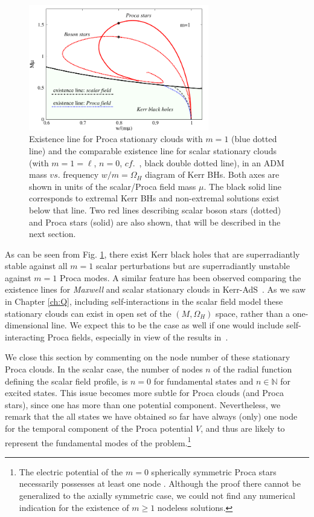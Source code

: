 \begin{figure}[h!]
  \begin{center}
    \includegraphics[width=0.7\textwidth]{papers/Proca/wM-m1-comparison.pdf}
  \end{center}
 \caption{Existence line for Proca stationary clouds with $m=1$ (blue dotted line) and the comparable existence line for scalar stationary clouds (with $m=1=\ell$, $n=0$, $cf.$~\cite{Benone:2014ssa}, black double dotted line), in an ADM mass $vs.$ frequency $w/m=\Omega_H$ diagram of Kerr BHs. Both axes are shown in units of the scalar/Proca field mass $\mu$. The black solid line corresponds to extremal Kerr BHs and non-extremal solutions exist below that line. Two red lines describing scalar boson stars (dotted) and Proca stars (solid) are also shown, that will be described in the next section.}
  \label{clouds}
\end{figure}

As can be seen from Fig. \ref{clouds}, there exist Kerr black holes that are superradiantly stable against all $m=1$ scalar perturbations but are superradiantly unstable against $m=1$ Proca modes.
A similar feature has been observed comparing the existence lines for \textit{Maxwell} and scalar stationary clouds in Kerr-AdS~\cite{Wang:2015fgp}.
As we saw in Chapter \ref{ch:Q}, including self-interactions in the scalar field model these stationary clouds can exist in open set of the $(M,\Omega_H)$ space, rather than a one-dimensional line.
We expect this to be the case as well if one would include self-interacting Proca fields, especially in view of the results in~\cite{Loginov:2015rya}.

We close this section by commenting on the node number of these stationary Proca clouds. 
In the scalar case, the number of nodes $n$ of the radial function defining the scalar field profile, 
is $n=0$ for fundamental states and $n\in \mathbb{N}$ for excited states. 
This issue becomes more subtle for Proca clouds (and Proca stars), 
since one has more than one potential component. Nevertheless, we remark that the all states we have obtained so far have always (only)
one node for the temporal component of the Proca potential  $V$, and thus are likely to represent the fundamental
modes of the problem.\footnote{The electric potential of the $m=0$ 
spherically symmetric Proca stars necessarily possesses at least one node \cite{Brito:2015pxa}.
Although the proof there cannot be generalized to the axially symmetric case,
we could not find any numerical indication for the existence of $m\geq 1$ nodeless solutions. 
}

